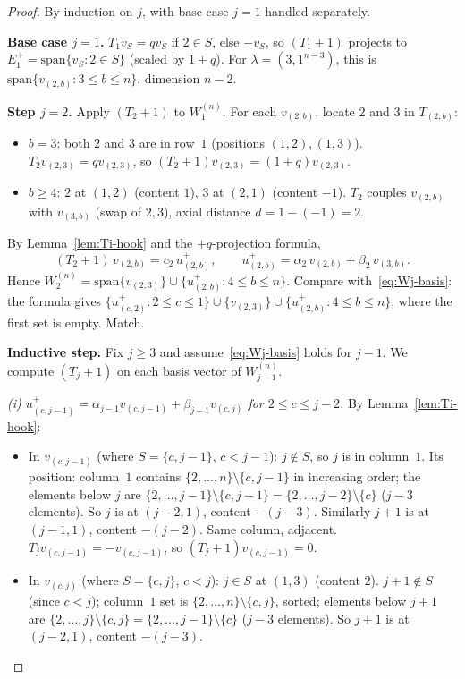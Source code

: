 \documentclass[11pt]{article}
\theoremstyle{definition}
\begin{document}
\begin{proof}
By induction on $j$, with base case $j=1$ handled separately.

\textbf{Base case $j=1$.}  $T_1v_S=qv_S$ if $2\in S$, else $-v_S$, so
$(T_1{+}1)$ projects to $E_1^+=\mathrm{span}\{v_S:2\in S\}$ (scaled by
$1+q$).  For $\lambda=(3,1^{n-3})$, this is
$\mathrm{span}\{v_{(2,b)} : 3\le b\le n\}$, dimension $n-2$.

\textbf{Step $j=2$.}  Apply $(T_2{+}1)$ to $W_1^{(n)}$.  For each
$v_{(2,b)}$, locate $2$ and $3$ in $T_{(2,b)}$:
\begin{itemize}[leftmargin=2em,topsep=0.3em,itemsep=0.2em]
\item $b=3$: both $2$ and $3$ are in row~$1$ (positions $(1,2),(1,3)$).
$T_2v_{(2,3)}=qv_{(2,3)}$, so $(T_2{+}1)v_{(2,3)}=(1{+}q)v_{(2,3)}$.
\item $b\ge 4$: $2$ at $(1,2)$ (content $1$), $3$ at $(2,1)$
(content $-1$).  $T_2$ couples $v_{(2,b)}$ with $v_{(3,b)}$ (swap of
$2,3$), axial distance $d=1-(-1)=2$.
\end{itemize}
By Lemma~\ref{lem:Ti-hook} and the $+q$-projection formula,
\[
   (T_2{+}1)\,v_{(2,b)} = c_2\,u^+_{(2,b)},
   \qquad u^+_{(2,b)} = \alpha_2\,v_{(2,b)}+\beta_2\,v_{(3,b)}.
\]
Hence $W_2^{(n)}=\mathrm{span}\{v_{(2,3)}\} \cup
\{u^+_{(2,b)} : 4\le b\le n\}$.  Compare with~\eqref{eq:Wj-basis}:
the formula gives
$\{u^+_{(c,2)} : 2\le c\le 1\}\cup\{v_{(2,3)}\}\cup
\{u^+_{(2,b)} : 4\le b\le n\}$, where the first set is empty.  Match.

\textbf{Inductive step.}  Fix $j\ge 3$ and assume~\eqref{eq:Wj-basis}
holds for $j-1$.  We compute $(T_j{+}1)$ on each basis vector of
$W_{j-1}^{(n)}$.

\emph{(i) $u^+_{(c,j-1)} = \alpha_{j-1}v_{(c,j-1)} + \beta_{j-1}v_{(c,j)}$
for $2\le c\le j-2$.}  By Lemma~\ref{lem:Ti-hook}:
\begin{itemize}[leftmargin=2em,topsep=0.3em,itemsep=0.2em]
\item In $v_{(c,j-1)}$ (where $S=\{c,j-1\}$, $c<j-1$): $j\notin S$, so
$j$ is in column~$1$.  Its position: column~$1$ contains
$\{2,\ldots,n\}\setminus\{c,j-1\}$ in increasing order; the elements
below $j$ are $\{2,\ldots,j-1\}\setminus\{c,j-1\}=\{2,\ldots,j-2\}\setminus\{c\}$
($j-3$ elements).  So $j$ is at $(j-2,1)$, content $-(j-3)$.  Similarly
$j+1$ is at $(j-1,1)$, content $-(j-2)$.  Same column, adjacent.
$T_jv_{(c,j-1)}=-v_{(c,j-1)}$, so $(T_j{+}1)v_{(c,j-1)}=0$.
\item In $v_{(c,j)}$ (where $S=\{c,j\}$, $c<j$): $j\in S$ at $(1,3)$
(content $2$).  $j+1\notin S$ (since $c<j$); column~$1$ set is
$\{2,\ldots,n\}\setminus\{c,j\}$, sorted; elements below $j+1$ are
$\{2,\ldots,j\}\setminus\{c,j\}=\{2,\ldots,j-1\}\setminus\{c\}$
($j-3$ elements).  So $j+1$ is at $(j-2,1)$, content $-(j-3)$.


\end{itemize}
\end{proof}
\end{document}
